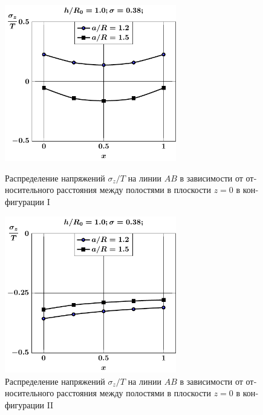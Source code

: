 \begin{russian}
\begin{figure}
\centering\footnotesize
\parbox[b]{7.5cm}{\centering\includegraphics[width=7.5cm]{cav2-a-h10-r10-z0-sig_z.pdf}
\caption{Распределение напряжений $\sigma_z/T$ на линии $AB$ в зависимости от относительного расстояния между полостями в плоскости $z=0$ в конфигурации I
\label{f:7:87}}}\hfil\hfil
\parbox[b]{7.5cm}{\centering\includegraphics[width=7.5cm]{cav2a-a-h10-r10-z0-sig_z.pdf}
\caption{Распределение напряжений $\sigma_z/T$ на линии $AB$ в зависимости от относительного расстояния между полостями в плоскости $z=0$ в конфигурации II
\label{f:7:88}}}
\end{figure}


\end{russian}
